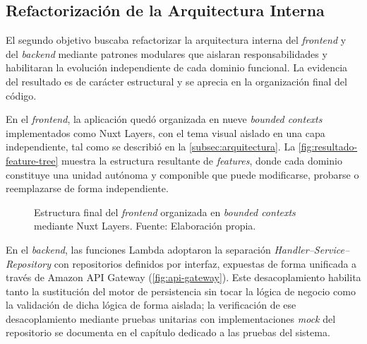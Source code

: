 \subsection{Refactorización de la Arquitectura Interna}\label{subsec:resultado-b}

El segundo objetivo buscaba refactorizar la arquitectura interna del \textit{frontend} y del \textit{backend} mediante patrones modulares que aislaran responsabilidades y habilitaran la evolución independiente de cada dominio funcional. La evidencia del resultado es de carácter estructural y se aprecia en la organización final del código.

En el \textit{frontend}, la aplicación quedó organizada en nueve \textit{bounded contexts} implementados como Nuxt Layers, con el tema visual aislado en una capa independiente, tal como se describió en la \autoref{subsec:arquitectura}. La \autoref{fig:resultado-feature-tree} muestra la estructura resultante de \textit{features}, donde cada dominio constituye una unidad autónoma y componible que puede modificarse, probarse o reemplazarse de forma independiente.

\newcommand\resultadoFeatureTreeCaption{Estructura final del \textit{frontend} organizada en \textit{bounded contexts} mediante Nuxt Layers. \hspace{1em}}
\begin{figure}[H]
  \centering
  \caption[\resultadoFeatureTreeCaption]{\resultadoFeatureTreeCaption Fuente: Elaboración propia.}
  \label{fig:resultado-feature-tree}
\end{figure}

En el \textit{backend}, las funciones Lambda adoptaron la separación \textit{Handler--Service--Repository} con repositorios definidos por interfaz, expuestas de forma unificada a través de Amazon API Gateway (\autoref{fig:api-gateway}). Este desacoplamiento habilita tanto la sustitución del motor de persistencia sin tocar la lógica de negocio como la validación de dicha lógica de forma aislada; la verificación de ese desacoplamiento mediante pruebas unitarias con implementaciones \textit{mock} del repositorio se documenta en el capítulo dedicado a las pruebas del sistema.

